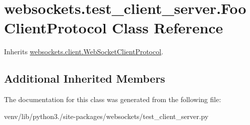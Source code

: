 \hypertarget{classwebsockets_1_1test__client__server_1_1_foo_client_protocol}{}\section{websockets.\+test\+\_\+client\+\_\+server.\+Foo\+Client\+Protocol Class Reference}
\label{classwebsockets_1_1test__client__server_1_1_foo_client_protocol}


Inherits \hyperlink{classwebsockets_1_1client_1_1_web_socket_client_protocol}{websockets.\+client.\+Web\+Socket\+Client\+Protocol}.

\subsection*{Additional Inherited Members}


The documentation for this class was generated from the following file\+:\begin{DoxyCompactItemize}
\item 
venv/lib/python3./site-\/packages/websockets/test\+\_\+client\+\_\+server.\+py\end{DoxyCompactItemize}
